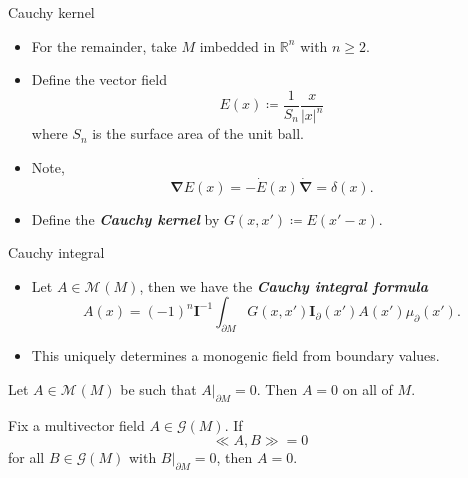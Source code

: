 \documentclass[aspectratio=169]{beamer}
\newcommand\boldgreen[1]{\textcolor{lighter_csu_green}{\emph{\textbf{#1}}}}
\newcommand{\R}{\mathbb{R}}
\newcommand{\grad}{\boldsymbol{\nabla}}
\newcommand{\G}{\mathcal{G}}
\newcommand{\blade}[1]{\boldsymbol{#1}}
\newcommand{\multivecinnerproduct}[2]{\ll #1, #2\gg}
\newcommand{\boundary}{{\partial M}}
\newcommand{\pseudoscalar}{\blade{I}}
\newcommand{\monogenicfields}[1]{\mathcal{M}^{#1}(M)}
\begin{document}
\begin{frame}{Cauchy kernel}
\vfill
\begin{itemize}
\pause
\item For the remainder, take $M$ imbedded in $\R^n$ with $n\geq 2$.
\pause
\item Define the vector field
\[
E(x) \coloneqq \frac{1}{S_n} \frac{x}{|x|^n}
\]
where $S_n$ is the surface area of the unit ball. 
\pause
\item Note,
\[
\grad E(x) = -\dot{E}(x)\dot{\grad} = \delta(x).
\]
\pause
\item Define the \boldgreen{Cauchy kernel} by $G(x,x')\coloneqq E(x'-x)$.
\end{itemize}
\vfill
\end{frame}

\begin{frame}{Cauchy integral}
\vfill
\begin{itemize}
\pause
\item Let $A\in \monogenicfields{}$, then we have the \boldgreen{Cauchy integral formula}
\[
A(x) = (-1)^n \pseudoscalar^{-1} \int_\boundary G(x,x') \pseudoscalar_\partial(x') A(x') \mu_\partial(x').
\]
\pause
\item This uniquely determines a monogenic field from boundary values.
\end{itemize}
\vfill
\end{frame}

\begin{frame}{}
\vfill
\begin{lemma}
Let $A\in \monogenicfields{}$ be such that $A\vert_\boundary = 0$. Then $A=0$ on all of $M$.
\end{lemma}
\begin{lemma}
Fix a multivector field $A\in \G(M)$. If
\[
\multivecinnerproduct{A}{B}=0
\]
for all $B\in \G(M)$ with $B\vert_{\boundary} = 0$, then $A=0$.
\end{lemma}
\vfill
\end{frame}

\end{document}
